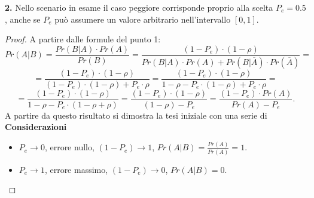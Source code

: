 \documentclass[12pt,oneside,openany]{memoir}
\numberwithin{equation}{subsection}
\begin{document}
\bigbreak\noindent
\textbf{2.} Nello scenario in esame il caso peggiore corrisponde proprio alla
scelta $P_e = 0.5$, anche se $P_e$ pu\`o assumere un valore arbitrario
nell'intervallo $[0, 1]$.
\begin{proof}
A partire dalle formule del punto 1:
\[
    Pr(A | B) = \frac{Pr(B | A) \cdot Pr(A)}{Pr(B)} = \frac{(1 - P_e) \cdot 
    (1 - \rho)}{Pr(B | A) \cdot Pr(A) + Pr(B | \overline{A}) \cdot
    Pr(\overline{A})} =
\]
\[
    = \frac{(1 - P_e) \cdot (1 - \rho)}{(1 - P_e) \cdot (1 - \rho) + P_e \cdot
    \rho} = \frac{(1 - P_e) \cdot (1 - \rho)}{1 - \rho - P_e \cdot (1 - \rho) +
    P_e \cdot \rho} =
\]
\[
    = \frac{(1 - P_e) \cdot (1 - \rho)}{1 - \rho - P_e \cdot (1 - \rho + \rho)}
    = \frac{(1 - P_e) \cdot (1 - \rho)}{(1 - \rho) - P_e} = \frac{(1 - P_e)
    \cdot Pr(A)}{Pr(A) - P_e}.
\]
A partire da questo risultato si dimostra la tesi iniziale con una serie di
\textbf{Considerazioni}\\
\begin{itemize}
    \item $P_e \rightarrow 0$, errore nullo, $(1 - P_e) \rightarrow 1$,
        $Pr(A | B) = \frac{Pr(A)}{Pr(A)} = 1$.
    \item $P_e \rightarrow 1$, errore massimo, $(1 - P_e) \rightarrow 0$,
        $Pr(A | B) = 0$.
\end{itemize}
\end{proof}


\newpage
\end{document}
